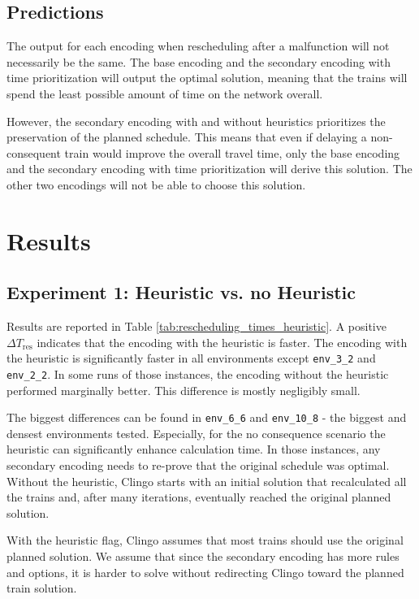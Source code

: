 \documentclass[runningheads]{llncs}
\begin{document}
\subsection{Predictions}
The output for each encoding when rescheduling after a malfunction will not
necessarily be the same. The base encoding and the secondary encoding with
time prioritization will output the optimal solution, meaning that the trains
will spend the least possible amount of time on the network overall.

However, the secondary encoding with and without heuristics prioritizes the
preservation of the planned schedule. This means that even if delaying a
non-consequent train would improve the overall travel time, only the base
encoding and the secondary encoding with time prioritization will derive this
solution. The other two encodings will not be able to choose this solution.

\section[Results]{Results\footnotemark}


\subsection{Experiment 1: Heuristic vs. no Heuristic}

Results are reported in Table \ref{tab:rescheduling_times_heuristic}. A positive $\Delta T_{\mathrm{res}}$ indicates that the encoding with the heuristic is faster. The encoding with the heuristic is significantly faster in all environments except \texttt{env\_3\_2} and \texttt{env\_2\_2}. In some runs of those instances, the encoding without the heuristic performed marginally better. This difference is mostly negligibly small.

The biggest differences can be found in \texttt{env\_6\_6} and \texttt{env\_10\_8} - the biggest and densest environments tested. Especially, for the no consequence scenario the heuristic can significantly enhance calculation time. In those instances, any secondary encoding needs to
re-prove that the original schedule was optimal. Without the heuristic, Clingo starts with an initial solution that recalculated all the trains and, after many iterations, eventually reached the original planned solution.

With the heuristic flag, Clingo assumes that most trains should use the
original planned solution. We assume that since the secondary encoding has more rules and options, it is harder to solve without redirecting Clingo toward the planned train solution.
\end{document}
